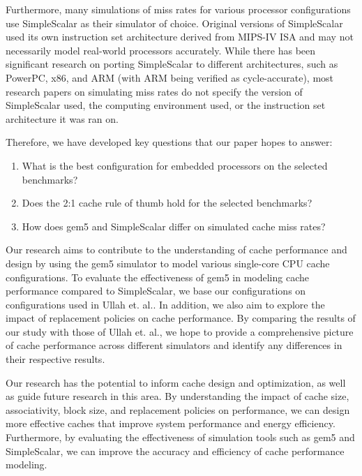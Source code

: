 \documentclass[conference]{IEEEtran}
\begin{document}
Furthermore, many simulations of miss rates for various processor configurations use SimpleScalar\cite{10.1145/268806.268810} as their simulator of choice. Original versions of SimpleScalar used its own instruction set architecture derived from MIPS-IV ISA\cite{10.1145/268806.268810} and may not necessarily model real-world processors accurately. While there has been significant research on porting SimpleScalar to different architectures, such as PowerPC, x86, and ARM\cite{10.1145/986537.986601} (with ARM being verified as cycle-accurate\cite{CHUNG2006137}), most research papers on simulating miss rates do not specify the version of SimpleScalar used, the computing environment used, or the instruction set architecture it was ran on.

Therefore, we have developed key questions that our paper hopes to answer:

\begin{enumerate}
  \item What is the best configuration for embedded processors on the selected benchmarks?
  \item Does the 2:1 cache rule of thumb hold for the selected benchmarks?
  \item How does gem5 and SimpleScalar differ on simulated cache miss rates?
\end{enumerate}

Our research aims to contribute to the understanding of cache performance and design by using the gem5 simulator to model various single-core CPU cache configurations. To evaluate the effectiveness of gem5 in modeling cache performance compared to SimpleScalar, we base our configurations on configurations used in Ullah et. al.. In addition, we also aim to explore the impact of replacement policies on cache performance. By comparing the results of our study with those of Ullah et. al., we hope to provide a comprehensive picture of cache performance across different simulators and identify any differences in their respective results.

Our research has the potential to inform cache design and optimization, as well as guide future research in this area. By understanding the impact of cache size, associativity, block size, and replacement policies on performance, we can design more effective caches that improve system performance and energy efficiency. Furthermore, by evaluating the effectiveness of simulation tools such as gem5 and SimpleScalar, we can improve the accuracy and efficiency of cache performance modeling.
\end{document}

